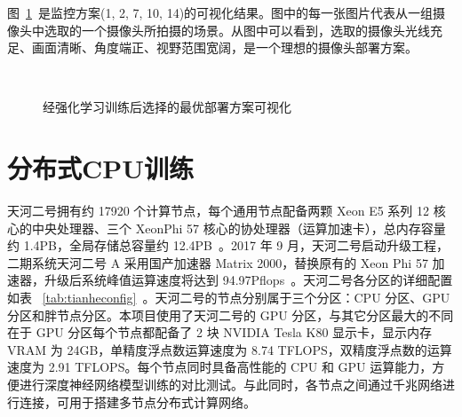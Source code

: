 图~\ref{fig:rlresult}~是监控方案(1, 2, 7, 10, 14)的可视化结果。图中的每一张图片代表从一组摄像头中选取的一个摄像头所拍摄的场景。从图中可以看到，选取的摄像头光线充足、画面清晰、角度端正、视野范围宽阔，是一个理想的摄像头部署方案。

\begin{figure}[!ht]
    \centering
    \quad
    \\
    \quad
    \quad
    \caption{经强化学习训练后选择的最优部署方案可视化}
    \label{fig:rlresult}
\end{figure}


\section{分布式CPU训练}

天河二号拥有约 17920 个计算节点，每个通用节点配备两颗 Xeon E5 系列 12 核心的中央处理器、三个 XeonPhi 57 核心的协处理器（运算加速卡），总内存容量约 1.4PB，全局存储总容量约 12.4PB~\cite{tianhe2018config}。2017 年 9 月，天河二号启动升级工程，二期系统天河二号 A 采用国产加速器 Matrix 2000，替换原有的 Xeon Phi 57 加速器，升级后系统峰值运算速度将达到 94.97Pflops~\cite{tianhe2017summary}。天河二号各分区的详细配置如表 ~\ref{tab:tianheconfig}~。天河二号的节点分别属于三个分区：CPU 分区、GPU 分区和胖节点分区。本项目使用了天河二号的 GPU 分区，与其它分区最大的不同在于 GPU 分区每个节点都配备了 2 块 NVIDIA Tesla K80 显示卡，显示内存 VRAM 为 24GB，单精度浮点数运算速度为 8.74 TFLOPS，双精度浮点数的运算速度为 2.91 TFLOPS。每个节点同时具备高性能的 CPU 和 GPU 运算能力，方便进行深度神经网络模型训练的对比测试。与此同时，各节点之间通过千兆网络进行连接，可用于搭建多节点分布式计算网络。

